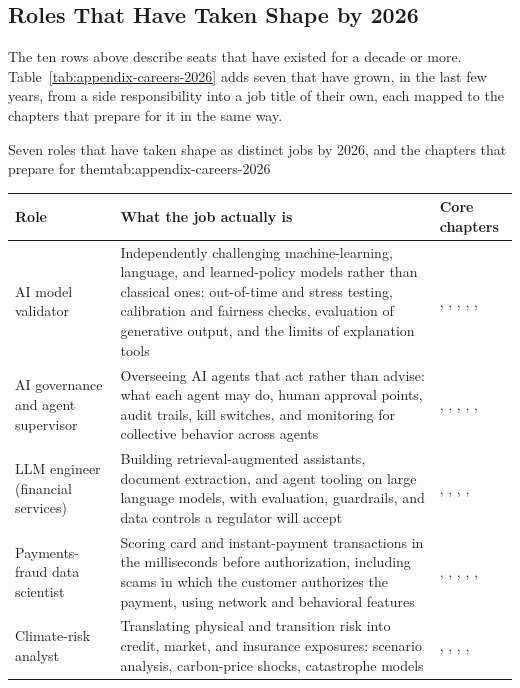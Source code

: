 \documentclass[../ai_in_finance]{subfiles}
\begin{document}
\subsection{Roles That Have Taken Shape by 2026}
\label{sec:appendix-careers-2026}

The ten rows above describe seats that have existed for a decade or more. Table~\ref{tab:appendix-careers-2026} adds seven that have grown, in the last few years, from a side responsibility into a job title of their own, each mapped to the chapters that prepare for it in the same way.

\begin{booktable}[htbp]{Seven roles that have taken shape as distinct jobs by 2026, and the chapters that prepare for them}{tab:appendix-careers-2026}
\begin{tabular}{L{3.4cm}L{5.6cm}L{3.4cm}}
\toprule
Role & What the job actually is & Core chapters \\
\midrule
AI model validator & Independently challenging machine-learning, language, and learned-policy models rather than classical ones: out-of-time and stress testing, calibration and fairness checks, evaluation of generative output, and the limits of explanation tools & , , , , ,  \\
AI governance and agent supervisor & Overseeing AI agents that act rather than advise: what each agent may do, human approval points, audit trails, kill switches, and monitoring for collective behavior across agents & , , , , ,  \\
LLM engineer (financial services) & Building retrieval-augmented assistants, document extraction, and agent tooling on large language models, with evaluation, guardrails, and data controls a regulator will accept & , , , ,  \\
Payments-fraud data scientist & Scoring card and instant-payment transactions in the milliseconds before authorization, including scams in which the customer authorizes the payment, using network and behavioral features & , , , , ,  \\
Climate-risk analyst & Translating physical and transition risk into credit, market, and insurance exposures: scenario analysis, carbon-price shocks, catastrophe models & , , , ,  \\

\end{tabular}
\end{booktable}
\end{document}
